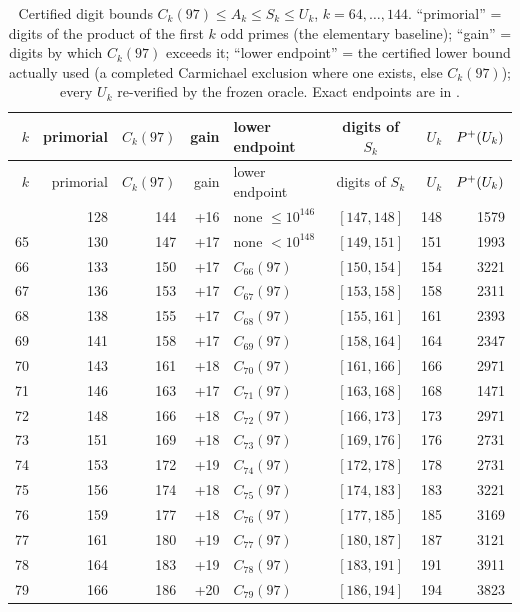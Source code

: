 \begin{longtable}{r r r r l c r r}
\caption{Certified digit bounds $C_k(97)\le A_k\le S_k\le U_k$, $k=64,\dots,144$. ``primorial'' = digits of the product of the first $k$ odd primes (the elementary baseline); ``gain'' = digits by which $C_k(97)$ exceeds it; ``lower endpoint'' = the certified lower bound actually used (a completed Carmichael exclusion where one exists, else $C_k(97)$); every $U_k$ re-verified by the frozen oracle. Exact endpoints are in .}\label{tab:ladder}\\
\toprule $k$ & primorial & $C_k(97)$ & gain & lower endpoint & digits of $S_k$ & $U_k$ & $P^{+}(U_k)$\\ \midrule \endfirsthead
\toprule $k$ & primorial & $C_k(97)$ & gain & lower endpoint & digits of $S_k$ & $U_k$ & $P^{+}(U_k)$\\ \midrule \endhead
\bottomrule \endfoot
64 & 128 & 144 & +16 & none $\le10^{146}$ & $[147,148]$ & 148 & 1579\\
65 & 130 & 147 & +17 & none $<10^{148}$ & $[149,151]$ & 151 & 1993\\
66 & 133 & 150 & +17 & $C_{66}(97)$ & $[150,154]$ & 154 & 3221\\
67 & 136 & 153 & +17 & $C_{67}(97)$ & $[153,158]$ & 158 & 2311\\
68 & 138 & 155 & +17 & $C_{68}(97)$ & $[155,161]$ & 161 & 2393\\
69 & 141 & 158 & +17 & $C_{69}(97)$ & $[158,164]$ & 164 & 2347\\
70 & 143 & 161 & +18 & $C_{70}(97)$ & $[161,166]$ & 166 & 2971\\
71 & 146 & 163 & +17 & $C_{71}(97)$ & $[163,168]$ & 168 & 1471\\
72 & 148 & 166 & +18 & $C_{72}(97)$ & $[166,173]$ & 173 & 2971\\
73 & 151 & 169 & +18 & $C_{73}(97)$ & $[169,176]$ & 176 & 2731\\
74 & 153 & 172 & +19 & $C_{74}(97)$ & $[172,178]$ & 178 & 2731\\
75 & 156 & 174 & +18 & $C_{75}(97)$ & $[174,183]$ & 183 & 3221\\
76 & 159 & 177 & +18 & $C_{76}(97)$ & $[177,185]$ & 185 & 3169\\
77 & 161 & 180 & +19 & $C_{77}(97)$ & $[180,187]$ & 187 & 3121\\
78 & 164 & 183 & +19 & $C_{78}(97)$ & $[183,191]$ & 191 & 3911\\
79 & 166 & 186 & +20 & $C_{79}(97)$ & $[186,194]$ & 194 & 3823\\

\end{longtable}
